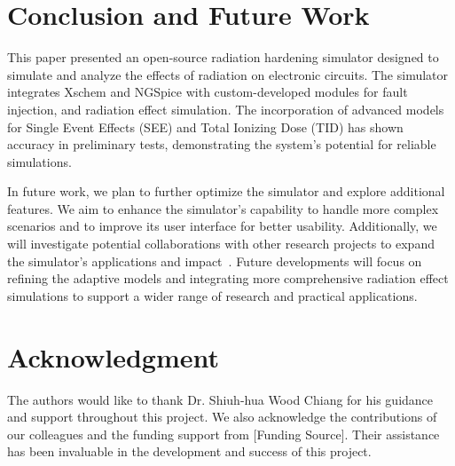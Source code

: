 \documentclass[conference]{IEEEtran}
\begin{document}
    \section{Conclusion and Future Work}\label{sec:conclusion-and-future-work}
    This paper presented an open-source radiation hardening simulator designed to simulate and analyze the effects of radiation on electronic circuits.
    The simulator integrates Xschem and NGSpice with custom-developed modules for fault injection, and radiation effect simulation.
    The incorporation of advanced models for Single Event Effects (SEE) and Total Ionizing Dose (TID) has shown accuracy in preliminary tests, demonstrating the system's potential for reliable simulations.

    In future work, we plan to further optimize the simulator and explore additional features.
    We aim to enhance the simulator's capability to handle more complex scenarios and to improve its user interface for better usability.
    Additionally, we will investigate potential collaborations with other research projects to expand the simulator's applications and impact~\cite{Pepper1990}.
    Future developments will focus on refining the adaptive models and integrating more comprehensive radiation effect simulations to support a wider range of research and practical applications.

    \section*{Acknowledgment}
    The authors would like to thank Dr. Shiuh-hua Wood Chiang for his guidance and support throughout this project.
    We also acknowledge the contributions of our colleagues and the funding support from [Funding Source].
    Their assistance has been invaluable in the development and success of this project.

    
    
\end{document}
